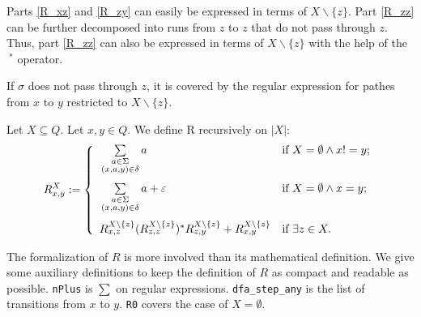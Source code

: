 Parts \ref{R_xz} and \ref{R_zy} can easily be expressed in terms of $X\backslash\{z\}$.
Part \ref{R_zz} can be further decomposed into runs from $z$ to $z$ that do not pass through $z$.
Thus, part \ref{R_zz} can also be expressed in terms of $X\backslash\{z\}$ with the help of the $\ ^*$ operator.

If $\sigma$ does not pass through $z$, it is covered by the regular expression for pathes from $x$ to $y$ restricted to $X\backslash\{z\}$.


\begin{definition}
    \label{R}
    Let $X \subseteq Q$. Let $x, y \in Q$.
    We define R recursively on $|X|$:
    \begin{equation*}
        R^X_{x,y} := \left\{  
                \begin{array}{ll}
                    \vphantom{ \sum\limits_{ \substack{ a \in \Sigma\\ (x,a,y) \in \delta \\ b \in \Sigma } } }
                    \sum\limits_{
                        \substack{
                            a \in \Sigma\\
                            (x,a,y) \in \delta
                        }
                    } a 
                    & \mbox{if } X = \emptyset \wedge x != y; \\
                    \vphantom{ \sum\limits_{ \substack{ a \in \Sigma\\ (x,a,y) \in \delta \\ b \in \Sigma } } }
                    \sum\limits_{
                        \substack{
                            a \in \Sigma\\
                            (x,a,y) \in \delta
                        }
                    } a + \varepsilon 
                    & \mbox{if } X = \emptyset \wedge x = y; \\
                     R^{X\backslash\{z\}}_{x,z} (R^{X\backslash\{z\}}_{z,z})^* R^{X\backslash\{z\}}_{z,y} + R^{X\backslash\{z\}}_{x,y}
                     & \mbox{if } \exists z \in X.
                \end{array}
            \right.
    \end{equation*}
\end{definition}

The formalization of $R$ is more involved than its mathematical definition. 
We give some auxiliary definitions to keep the definition of $R$ as compact and readable as possible.
\lstinline{nPlus} is $\sum$ on regular expressions.
\lstinline{dfa_step_any} is the list of transitions from $x$ to $y$.
\lstinline{R0} covers the case of $X=\emptyset$.

